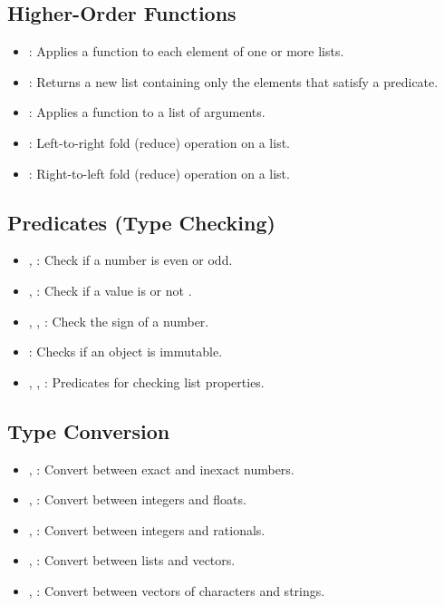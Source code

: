 \subsection{Higher-Order Functions}
\begin{itemize}
    \item {}: Applies a function to each element of one or more lists.
    \item {}: Returns a new list containing only the elements that satisfy a predicate.
    \item {}: Applies a function to a list of arguments.
    \item {}: Left-to-right fold (reduce) operation on a list.
    \item {}: Right-to-left fold (reduce) operation on a list.
\end{itemize}

\subsection{Predicates (Type Checking)}
\begin{itemize}
    \item {}, : Check if a number is even or odd.
    \item {}, : Check if a value is  or not .
    \item {}, , : Check the sign of a number.
    \item {}: Checks if an object is immutable.
    \item {}, , : Predicates for checking list properties.
\end{itemize}

\subsection{Type Conversion}
\begin{itemize}
    \item {}, : Convert between exact and inexact numbers.
    \item {}, : Convert between integers and floats.
    \item {}, : Convert between integers and rationals.
    \item {}, : Convert between lists and vectors.
    \item {}, : Convert between vectors of characters and strings.
\end{itemize}

